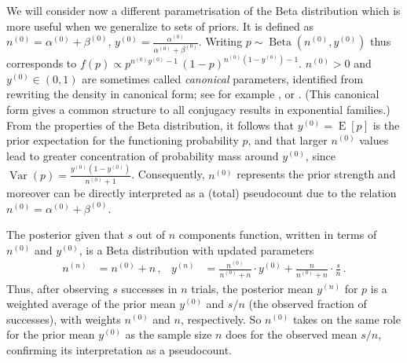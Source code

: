 \documentclass[runningheads,a4paper]{llncs}
\newcommand{\uz}{^{(0)}} %
\newcommand{\un}{^{(n)}} %
\def\yz{y\uz}
\def\yn{y\un}
\def\nz{n\uz}
\def\nn{n\un}
\newcommand{\az}{\alpha\uz}
\newcommand{\bz}{\beta\uz}
\newcommand{\E}{\operatorname{E}}
\newcommand{\V}{\operatorname{Var}}
\newcommand{\be}{\operatorname{Beta}}   %
\begin{document}
We will consider now a different parametrisation of the Beta distribution
which is more useful when we generalize to sets of priors. %
It is defined as
$\nz = \az + \bz$, $\yz = \frac{\az}{\az+\bz}$.
Writing $p \sim \be(\nz,\yz)$ thus corresponds to
$f(p) \propto p^{\nz\yz-1}\, (1-p)^{\nz(1-\yz)-1}$.
$\nz > 0$ and $\yz \in (0,1)$ are sometimes called \emph{canonical} parameters,
identified from rewriting the density in canonical form;
see for example \cite[pp.~202 and 272f]{2000:bernardosmith}, or \cite[\S 1.2.3.1]{2013:diss-gw}.
(This canonical form gives a common structure to all conjugacy results in exponential families.)
From the properties of the Beta distribution,
it follows that $\yz = \E[p]$ is the prior expectation for the functioning probability $p$,
and that larger $\nz$ values lead to greater concentration of probability mass around $\yz$,
since $\V(p) = \frac{\yz (1-\yz)}{\nz + 1}$.
Consequently, $\nz$ represents the prior strength
and moreover can be directly interpreted as a (total) pseudocount due to the relation $\nz = \az + \bz$.

The posterior given that $s$ out of $n$ components function,
written in terms of $\nz$ and $\yz$,
is a Beta distribution with updated parameters
\begin{align}
\nn &= \nz + n\,, &
\yn &= \frac{\nz}{\nz + n} \cdot \yz + \frac{n}{\nz + n} \cdot \frac{s}{n}\,.
\label{eq:nyupdate}
\end{align}
Thus, after observing $s$ successes in $n$ trials,
the posterior mean $\yn$ for $p$ is a weighted average of
the prior mean $\yz$ and $s/n$ (the observed fraction of successes),
with weights $\nz$ and $n$, respectively.
So $\nz$ takes on the same role for the prior mean $\yz$
as the sample size $n$ does for the observed mean $s/n$,
confirming its interpretation as a pseudocount.
\end{document}
